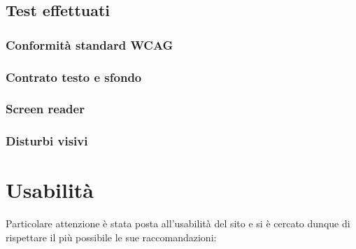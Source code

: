 \documentclass[12pt]{article}
\begin{document}
	\subsection{Test effettuati}
		\subsubsection{Conformità standard WCAG}
		\subsubsection{Contrato testo e sfondo}
		\subsubsection{Screen reader}		
		\subsubsection{Disturbi visivi}
		
\section{Usabilità}
Particolare attenzione è stata posta all’usabilità del sito e si è cercato dunque di rispettare il più possibile le sue raccomandazioni:
\end{document}

